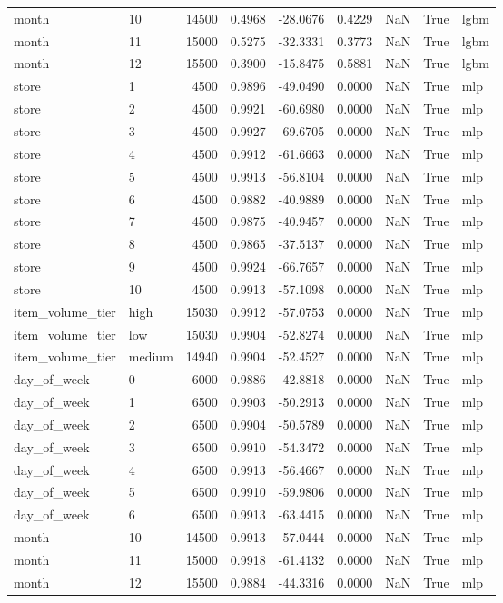 \begin{table}
\begin{tabular}{llrrrrrrl}
month & 10 & 14500 & 0.4968 & -28.0676 & 0.4229 & NaN & True & lgbm \\
month & 11 & 15000 & 0.5275 & -32.3331 & 0.3773 & NaN & True & lgbm \\
month & 12 & 15500 & 0.3900 & -15.8475 & 0.5881 & NaN & True & lgbm \\
store & 1 & 4500 & 0.9896 & -49.0490 & 0.0000 & NaN & True & mlp \\
store & 2 & 4500 & 0.9921 & -60.6980 & 0.0000 & NaN & True & mlp \\
store & 3 & 4500 & 0.9927 & -69.6705 & 0.0000 & NaN & True & mlp \\
store & 4 & 4500 & 0.9912 & -61.6663 & 0.0000 & NaN & True & mlp \\
store & 5 & 4500 & 0.9913 & -56.8104 & 0.0000 & NaN & True & mlp \\
store & 6 & 4500 & 0.9882 & -40.9889 & 0.0000 & NaN & True & mlp \\
store & 7 & 4500 & 0.9875 & -40.9457 & 0.0000 & NaN & True & mlp \\
store & 8 & 4500 & 0.9865 & -37.5137 & 0.0000 & NaN & True & mlp \\
store & 9 & 4500 & 0.9924 & -66.7657 & 0.0000 & NaN & True & mlp \\
store & 10 & 4500 & 0.9913 & -57.1098 & 0.0000 & NaN & True & mlp \\
item\_volume\_tier & high & 15030 & 0.9912 & -57.0753 & 0.0000 & NaN & True & mlp \\
item\_volume\_tier & low & 15030 & 0.9904 & -52.8274 & 0.0000 & NaN & True & mlp \\
item\_volume\_tier & medium & 14940 & 0.9904 & -52.4527 & 0.0000 & NaN & True & mlp \\
day\_of\_week & 0 & 6000 & 0.9886 & -42.8818 & 0.0000 & NaN & True & mlp \\
day\_of\_week & 1 & 6500 & 0.9903 & -50.2913 & 0.0000 & NaN & True & mlp \\
day\_of\_week & 2 & 6500 & 0.9904 & -50.5789 & 0.0000 & NaN & True & mlp \\
day\_of\_week & 3 & 6500 & 0.9910 & -54.3472 & 0.0000 & NaN & True & mlp \\
day\_of\_week & 4 & 6500 & 0.9913 & -56.4667 & 0.0000 & NaN & True & mlp \\
day\_of\_week & 5 & 6500 & 0.9910 & -59.9806 & 0.0000 & NaN & True & mlp \\
day\_of\_week & 6 & 6500 & 0.9913 & -63.4415 & 0.0000 & NaN & True & mlp \\
month & 10 & 14500 & 0.9913 & -57.0444 & 0.0000 & NaN & True & mlp \\
month & 11 & 15000 & 0.9918 & -61.4132 & 0.0000 & NaN & True & mlp \\
month & 12 & 15500 & 0.9884 & -44.3316 & 0.0000 & NaN & True & mlp \\
\bottomrule
\end{tabular}
\end{table}
